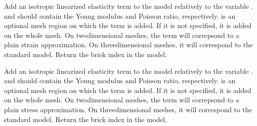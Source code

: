 \documentclass[a4paper,11pt,english]{sphinxmanual}
\begin{document}
\begin{fulllineitems}
\begin{fulllineitems}
\label{\detokenize{python/cmdref_Model:getfem.Model.add_isotropic_linearized_elasticity_brick_pstrain}}
Add an isotropic linearized elasticity term to the model relatively to
the variable .  and  should
contain the Young modulus and Poisson ratio, respectively.
 is an optional mesh region on which the term is added.
If it is not specified, it is added
on the whole mesh.
On two\sphinxhyphen{}dimensional meshes, the term will correpsond to a plain strain
approximation. On three\sphinxhyphen{}dimensional meshes, it will correspond to the
standard model. 
Return the brick index in the model.

\end{fulllineitems}


\begin{fulllineitems}
\label{\detokenize{python/cmdref_Model:getfem.Model.add_isotropic_linearized_elasticity_brick_pstress}}
Add an isotropic linearized elasticity term to the model relatively to
the variable .  and  should
contain the Young modulus and Poisson ratio, respectively.
 is an optional mesh region on which the term is added.
If it is not specified, it is added
on the whole mesh.
On two\sphinxhyphen{}dimensional meshes, the term will correpsond to a plain stress
approximation. On three\sphinxhyphen{}dimensional meshes, it will correspond to the
standard model. 
Return the brick index in the model.

\end{fulllineitems}


\end{fulllineitems}
\end{document}
